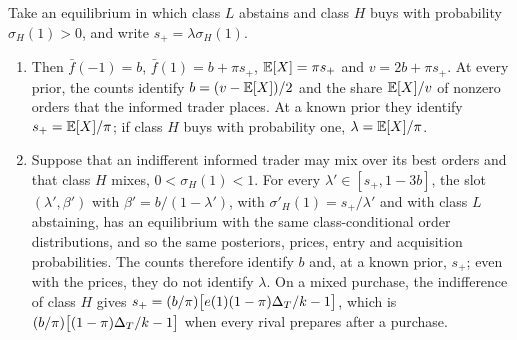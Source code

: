\begin{corollary}\label{cor:purchasesonly}
Take an equilibrium in which class \(L\) abstains and class \(H\) buys with probability \(\sigma_H(1)>0\), and write
\(s_+=\lambda\sigma_H(1)\).
\begin{enumerate}[label=(\alph*),leftmargin=2em]
\item Then \(\bar f(-1)=b\), \(\bar f(1)=b+\pi s_+\), \(\mathbb{E}[X]=\pi s_+\) and \(v=2b+\pi s_+\). At every prior, the
counts identify \(b=(v-\mathbb{E}[X])/2\) and the share \(\mathbb{E}[X]/v\) of nonzero orders that the informed trader places. At
a known prior they identify \(s_+=\mathbb{E}[X]/\pi\); if class \(H\) buys with probability one, \(\lambda=\mathbb{E}[X]/\pi\).
\item Suppose that an indifferent informed trader may mix over its best orders and that class \(H\) mixes,
\(0<\sigma_H(1)<1\). For every \(\lambda'\in[s_+,1-3b]\), the slot \((\lambda',\beta')\) with \(\beta'=b/(1-\lambda')\), with
\(\sigma'_H(1)=s_+/\lambda'\) and with class \(L\) abstaining, has an equilibrium with the same class-conditional
order distributions, and so the same posteriors, prices, entry and acquisition probabilities. The counts
therefore identify \(b\) and, at a known prior, \(s_+\); even with the prices, they do not identify \(\lambda\). On a mixed purchase, the indifference of
class \(H\) gives \(s_+=(b/\pi)\bigl[e(1)(1-\pi)\Delta_T/k-1\bigr]\), which is \((b/\pi)\bigl[(1-\pi)\Delta_T/k-1\bigr]\) when
every rival prepares after a purchase.
\end{enumerate}
\end{corollary}

